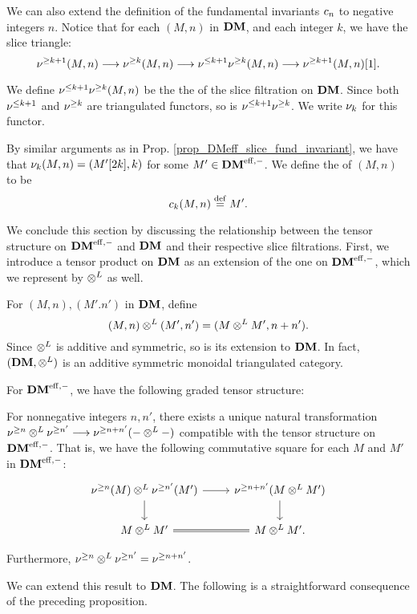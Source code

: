 We can also extend the definition of the fundamental invariants
$c_{n}$ to negative integers $n$. Notice that for each $(M, n)$
in $\mathbf{DM}$, and each integer $k$, we have the slice triangle:
\[
\nu^{\geq k + 1}(M, n) \longrightarrow \nu^{\geq k}(M, n) \longrightarrow \nu^{\leq k + 1}\nu^{\geq k}(M, n)
\longrightarrow \nu^{\geq k + 1}(M, n)[1].
\]

\begin{defn}
We define $\nu^{\leq k + 1}\nu^{\geq k}(M, n)$ be the the  of the slice filtration on $\mathbf{DM}$. Since both $\nu^{\leq k + 1}$ 
and $\nu^{\geq k}$ are triangulated functors, so is $\nu^{\leq k + 1}
\nu^{\geq k}$. We write $\nu_{k}$ for this functor. 

By similar arguments as in Prop. 
\ref{prop_DMeff_slice_fund_invariant}, we have that 
$\nu_{k}(M, n) = (M'[2k], k)$ for some $M' \in \mathbf{DM}^{\mathrm{eff},-}$. We 
define the  of $(M, n)$ to be
\[
c_{k}(M, n) \stackrel{\mathrm{def}}{=} M'.
\]
\end{defn}

We conclude this section by discussing the relationship between the
tensor structure on $\mathbf{DM}^{\mathrm{eff},-}$ and $\mathbf{DM}$ and their respective slice 
filtrations. First, we introduce a tensor product on $\mathbf{DM}$ as an 
extension of the one on $\mathbf{DM}^{\mathrm{eff},-}$, which we represent by $\otimes^L$ as
well.

For $(M, n), (M'. n')$ in $\mathbf{DM}$, define 
\[
(M, n) \otimes^L (M', n') = (M \otimes^L M', n + n'). 
\]
Since $\otimes^L$ is additive and symmetric, so is its extension to 
$\mathbf{DM}$. In fact, $(\mathbf{DM}, \otimes^L)$ is an additive symmetric monoidal 
triangulated category.

For $\mathbf{DM}^{\mathrm{eff},-}$, we have the following graded tensor structure:

\begin{prop}\label{prop_tDM_sfilt_DMeff}
For nonnegative integers $n, n'$, there exists a unique natural
transformation $\nu^{\geq n} \otimes^L \nu^{\geq n'} \longrightarrow \nu^{\geq n + n'}(- 
\otimes^L -)$ compatible with the tensor structure on $\mathbf{DM}^{\mathrm{eff},-}$. That 
is, we have the following commutative square for each $M$ and
$M'$ in $\mathbf{DM}^{\mathrm{eff},-}$:
\[
\begin{tikzcd}
\sgDM{n}(M) \tDM \sgDM{n'}(M') \arrow{r} \arrow{d} &
\sgDM{n + n'}(M \tDM M') \arrow{d} \\
M \tDM M' \arrow[equals]{r} &
M \tDM M'.
\end{tikzcd}
\]

Furthermore, $\nu^{\geq n} \otimes^L \nu^{\geq n'} = \nu^{\geq n + n'}$. 
\end{prop}

We can extend this result to $\mathbf{DM}$. The following is a
straightforward consequence of the preceding proposition.

